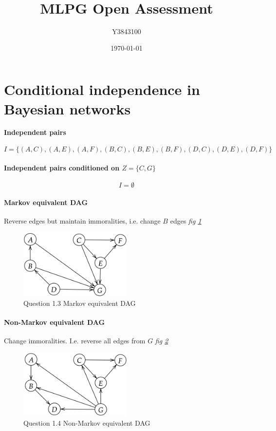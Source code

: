 \documentclass[11pt,a4paper]{article}
\title{MLPG Open Assessment}
\author{Y3843100}
\date{\today}
\begin{document}
\maketitle


\section{Conditional independence in Bayesian networks}

\paragraph{Independent pairs}
\[I = \{(A,C),(A,E),(A,F),(B,C),(B,E),(B,F),(D,C),(D,E),(D,F)\}\]

\paragraph{Independent pairs conditioned on \(Z = \{C,G\}\)}

\[I = \emptyset\]

\paragraph{Markov equivalent DAG}
Reverse edges but maintain immoralities, i.e. change \(B\) edges \textit{fig \ref{fig:1.3}}

\begin{figure}[htb]
  \centering
    \includegraphics[width=0.5\textwidth]{../q1/fig13.png}
    \caption{Question 1.3 Markov equivalent DAG}
  \label{fig:1.3}
\end{figure}

\paragraph{Non-Markov equivalent DAG}
Change immoralities. I.e. reverse all edges from \(G\) \textit{fig \ref{fig:1.4}}
\begin{figure}[htb]
  \centering
    \includegraphics[width=0.5\textwidth]{../q1/fig14.png}
    \caption{Question 1.4 Non-Markov equivalent DAG}
  \label{fig:1.4}
\end{figure}
\end{document}
